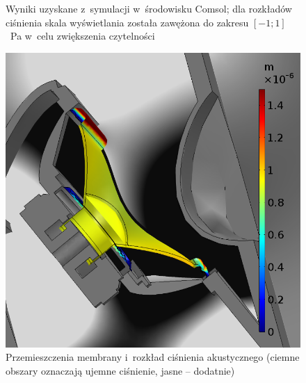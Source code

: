 \documentclass[12pt]{oska}
\begin{document}
\begin{figure}[!ht]
			\caption{Wyniki uzyskane z~symulacji w~środowisku Comsol; dla rozkładów ciśnienia skala wyświetlania została zawężona do zakresu $[-1;1]$~\si{\pascal} w~celu zwiększenia czytelności}
			\label{r:Comsol}
		\end{figure}
		
		\begin{figure}[!ht]
			\centering
			\includegraphics[width=.6\textwidth]{disp_presure_1kHz.png}
			\caption{Przemieszczenia membrany i~rozkład ciśnienia akustycznego (ciemne obszary oznaczają ujemne ciśnienie, jasne -- dodatnie)}
			\label{r:C_przem_cisn}
		\end{figure}
		
\end{document}
